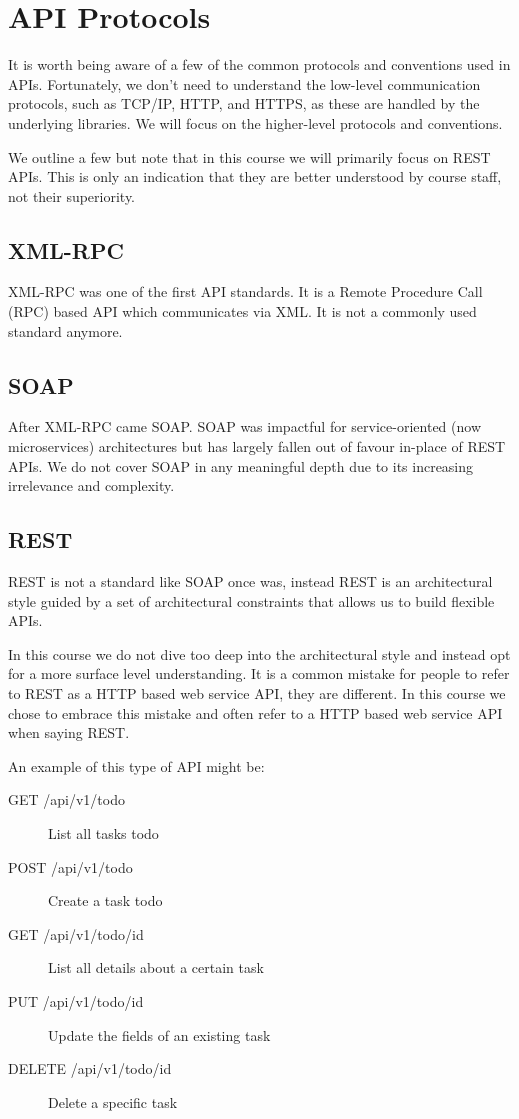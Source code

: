 \documentclass{csse4400}
\begin{document}
\section{API Protocols}
It is worth being aware of a few of the common protocols and conventions used in APIs.
Fortunately, we don't need to understand the low-level communication protocols,
such as TCP/IP, HTTP, and HTTPS,
as these are handled by the underlying libraries.
We will focus on the higher-level protocols and conventions.

We outline a few but note that in this course we will primarily focus on REST APIs.
This is only an indication that they are better understood by course staff,
not their superiority.

\subsection{XML-RPC}
XML-RPC was one of the first API standards.
It is a Remote Procedure Call (RPC) based API which communicates via XML.
It is not a commonly used standard anymore.

\subsection{SOAP}
After XML-RPC came SOAP.
SOAP was impactful for service-oriented (now microservices) architectures but has largely fallen out of favour in-place of REST APIs.
We do not cover SOAP in any meaningful depth due to its increasing irrelevance and complexity.

\subsection{REST}
REST is not a standard like SOAP once was,
instead REST is an architectural style guided by a set of architectural constraints that allows us to build flexible APIs.

In this course we do not dive too deep into the architectural style and instead opt for a more surface level understanding.
It is a common mistake for people to refer to REST as a HTTP based web service API,
they are different.
In this course we chose to embrace this mistake and often refer to a HTTP based web service API when saying REST.

\noindent An example of this type of API might be:
\begin{description}
  \item[GET /api/v1/todo] List all tasks todo
  \item[POST /api/v1/todo] Create a task todo
  \item[GET /api/v1/todo/{id}] List all details about a certain task
  \item[PUT /api/v1/todo/{id}] Update the fields of an existing task
  \item[DELETE /api/v1/todo/{id}] Delete a specific task
\end{description}
\end{document}
